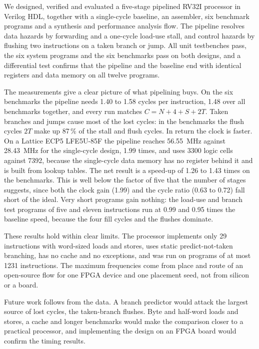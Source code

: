 We designed, verified and evaluated a five-stage pipelined RV32I processor in Verilog
HDL, together with a single-cycle baseline, an assembler, six benchmark programs and a
synthesis and performance analysis flow. The pipeline resolves data hazards by forwarding
and a one-cycle load-use stall, and control hazards by flushing two instructions on a taken
branch or jump. All unit testbenches pass, the six system programs and the six benchmarks pass on
both designs, and a differential test confirms that the pipeline and the baseline end with
identical registers and data memory on all twelve programs.

The measurements give a clear picture of what pipelining buys. On the six benchmarks the
pipeline needs 1.40 to 1.58 cycles per instruction, 1.48 over all benchmarks together, and
every run matches $C = N + 4 + S + 2T$. Taken branches and jumps cause most of the lost
cycles: in the benchmarks the flush cycles $2T$ make up 87\,\% of the stall and flush
cycles. In return the clock is faster. On a Lattice ECP5 LFE5U-85F the pipeline reaches
56.55~MHz against 28.43~MHz for the single-cycle design, 1.99 times, and uses 3300 logic
cells against 7392, because the single-cycle data memory has no register behind it and is
built from lookup tables. The net result is a speed-up of 1.26 to 1.43 times on the
benchmarks. This is well below the factor of five that the number of stages suggests,
since both the clock gain (1.99) and the cycle ratio (0.63 to 0.72) fall short of the ideal.
Very short programs gain nothing: the load-use and branch test programs of five and eleven
instructions run at 0.99 and 0.95 times the baseline speed, because the four fill cycles and
the flushes dominate.

These results hold within clear limits. The processor implements only 29 instructions with
word-sized loads and stores, uses static predict-not-taken branching, has no cache and no
exceptions, and was run on programs of at most 1231 instructions. The maximum frequencies
come from place and route of an open-source flow for one FPGA device and one placement seed,
not from silicon or a board.

Future work follows from the data. A branch predictor would attack the largest source of
lost cycles, the taken-branch flushes. Byte and half-word loads and stores, a cache and
longer benchmarks would make the comparison closer to a practical processor, and
implementing the design on an FPGA board would confirm the timing results.
